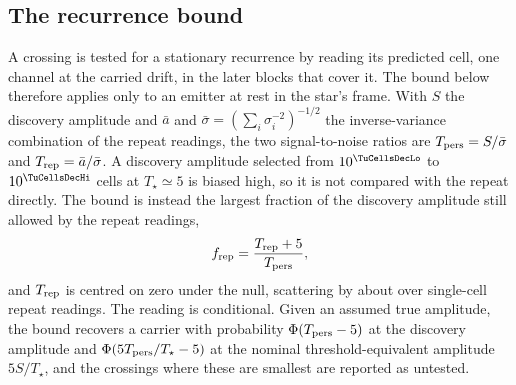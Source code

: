 \subsection{The recurrence bound}
\label{sec:nullscatter}

A crossing is tested for a stationary recurrence by reading its predicted
cell, one channel at the carried drift, in the later blocks that cover it.
The bound below therefore applies only to an emitter at rest in the star's
frame. With $S$
the discovery amplitude and $\bar{a}$ and $\bar{\sigma}=(\sum_i
\sigma_i^{-2})^{-1/2}$ the inverse-variance combination of the repeat
readings, the two signal-to-noise ratios are $T_{\rm pers}=S/\bar{\sigma}$
and $T_{\rm rep}=\bar{a}/\bar{\sigma}$. A discovery amplitude selected from
$10^{\TuCellsDecLo}$ to $10^{\TuCellsDecHi}$ cells at $T_\star\simeq5$ is
biased high, so it is not compared with the repeat directly. The bound is
instead the largest fraction of the discovery amplitude still allowed by the
repeat readings,
\begin{equation*}
f_{\rm rep}=\frac{T_{\rm rep}+5}{T_{\rm pers}},
\end{equation*}
and $T_{\rm rep}$ is centred on zero under the null, scattering by
\NuNullSd{} about \NuNullMean{} over \NuNullN{} single-cell repeat readings.
The reading is conditional. Given an assumed true amplitude, the bound
recovers a carrier with probability $\Phi(T_{\rm pers}-5)$ at the discovery
amplitude and $\Phi(5T_{\rm pers}/T_\star-5)$ at the nominal
threshold-equivalent amplitude $5S/T_\star$, and the \HjNPowerLo{} crossings
where these are smallest are reported as untested.
